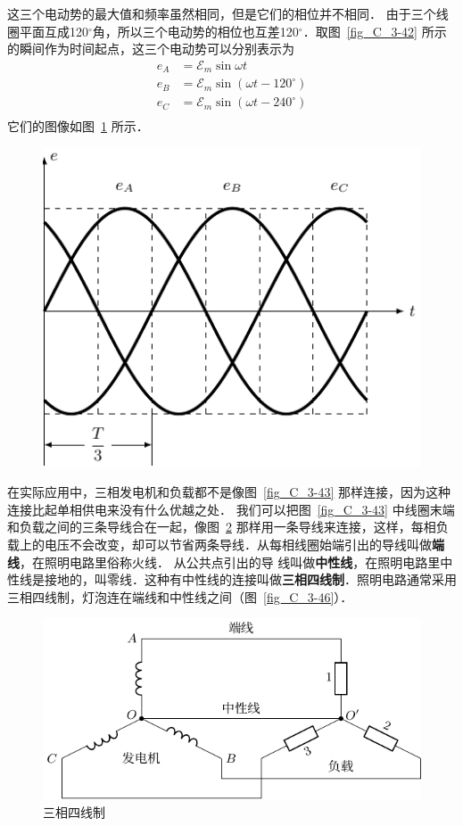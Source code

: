 这三个电动势的最大值和频率虽然相同，但是它们的相位并不相同．
由于三个线圈平面互成120$^\circ$角，所以三个电动势的相位也互差120$^\circ$．取图~\ref{fig_C_3-42} 所示的瞬间作为时间起点，这三个电动势可以分别表示为
\[\begin{split}
e_A&=\mathcal{E}_m\sin \omega t\\
e_B&=\mathcal{E}_m\sin (\omega t-120^\circ)\\
e_C&=\mathcal{E}_m\sin (\omega t-240^\circ)\\
\end{split}\]
它们的图像如图~\ref{fig_C_3-44} 所示．
\begin{figure}[htbp]
    \centering
    \includegraphics{fig/C/3-44.pdf}
    \caption{}\label{fig_C_3-44}
\end{figure}

在实际应用中，三相发电机和负载都不是像图~\ref{fig_C_3-43} 那样连接，因为这种连接比起单相供电来没有什么优越之处．
我们可以把图~\ref{fig_C_3-43} 中线圈末端和负载之间的三条导线合在一起，像图~\ref{fig_C_3-45} 那样用一条导线来连接，这样，每相负载上的电压不会改变，却可以节省两条导线．从每相线圈始端引出的导线叫做\textbf{端线}，在照明电路里俗称火线．
从公共点引出的导
线叫做\textbf{中性线}，在照明电路里中性线是接地的，叫零线．这种有中性线的连接叫做\textbf{三相四线制}．照明电路通常采用三相四线制，灯泡连在端线和中性线之间（图~\ref{fig_C_3-46}）．
\begin{figure}[htbp]
    \centering
    \includegraphics{fig/C/3-45.pdf}
    \caption{三相四线制}\label{fig_C_3-45}
\end{figure}


